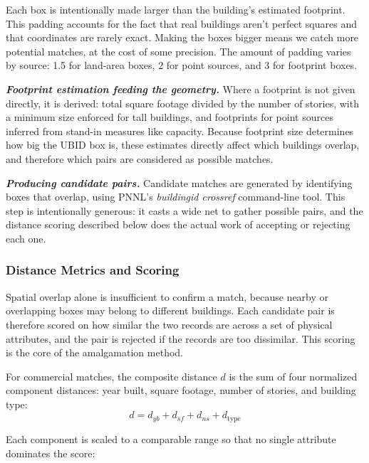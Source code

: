 Each box is intentionally made larger than the building's estimated footprint. This padding accounts for the fact that real buildings aren't perfect squares and that coordinates are rarely exact. Making the boxes bigger means we catch more potential matches, at the cost of some precision. The amount of padding varies by source: 1.5 for land-area boxes, 2 for point sources, and 3 for footprint boxes.

\textbf{\textit{Footprint estimation feeding the geometry.}} Where a footprint is not given directly, it is derived: total square footage divided by the number of stories, with a minimum size enforced for tall buildings, and footprints for point sources inferred from stand-in measures like capacity. Because footprint size determines how big the UBID box is, these estimates directly affect which buildings overlap, and therefore which pairs are considered as possible matches.

\textbf{\textit{Producing candidate pairs.}} Candidate matches are generated by identifying boxes that overlap, using PNNL's \textit{buildingid crossref} command-line tool. This step is intentionally generous: it casts a wide net to gather possible pairs, and the distance scoring described below does the actual work of accepting or rejecting each one.

\subsubsection{Distance Metrics and Scoring}
\label{sec:distance-metrics}

Spatial overlap alone is insufficient to confirm a match, because nearby or overlapping boxes may belong to different buildings. Each candidate pair is therefore scored on how similar the two records are across a set of physical attributes, and the pair is rejected if the records are too dissimilar. This scoring is the core of the amalgamation method.

For commercial matches, the composite distance $d$ is the sum of four normalized component distances: year built, square footage, number of stories,
and building type:
\begin{equation}
  d = d_{yb} + d_{sf} + d_{ns} + d_{\mathrm{type}}
  \label{eq:composite-distance}
\end{equation}

Each component is scaled to a comparable range so that no single attribute dominates the score:

